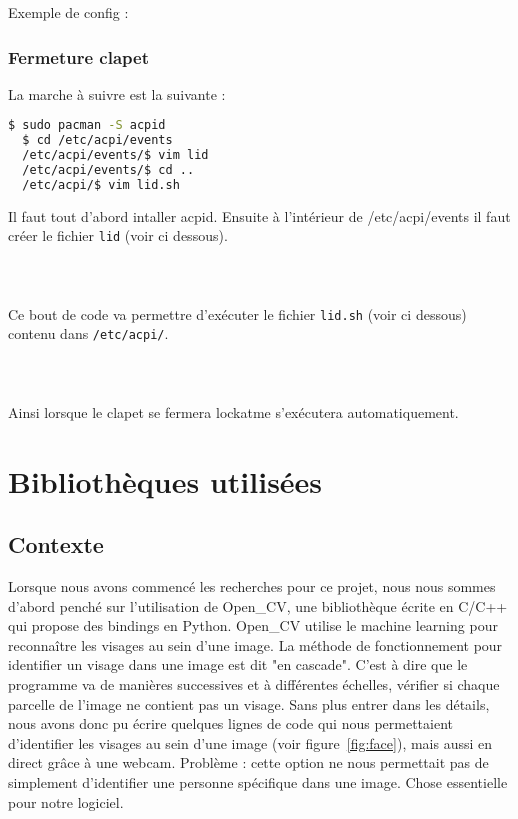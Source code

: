 Exemple de config :

\subsubsection{Fermeture clapet}
La marche à suivre est la suivante :
\begin{lstlisting}[language=bash]
  $ sudo pacman -S acpid
  $ cd /etc/acpi/events
  /etc/acpi/events/$ vim lid
  /etc/acpi/events/$ cd ..
  /etc/acpi/$ vim lid.sh
\end{lstlisting}
Il faut tout d'abord intaller acpid. Ensuite à
l'intérieur de /etc/acpi/events il faut créer le
fichier \verb|lid| (voir ci dessous).\\
\\
\\
\\
Ce bout de code va permettre d'exécuter le fichier \verb|lid.sh| (voir ci dessous)
contenu dans \verb|/etc/acpi/|.\\
\\
\\
\\
Ainsi lorsque le clapet se fermera lockatme s'exécutera automatiquement.

\newpage

\section{Bibliothèques utilisées}
\subsection{Contexte}
Lorsque nous avons commencé les recherches pour ce projet, nous nous sommes
d'abord penché sur l'utilisation de Open\_CV, une bibliothèque écrite en C/C++ qui
propose des bindings en Python. Open\_CV utilise le machine learning pour
reconnaître les visages au sein d'une image. La méthode de fonctionnement pour
identifier un visage dans une image est dit "en cascade". C'est à dire que le
programme va de manières successives et à différentes échelles, vérifier si
chaque parcelle de l'image ne contient pas un visage. Sans plus entrer dans
les détails, nous avons donc pu écrire quelques lignes de code qui nous
permettaient d'identifier les visages au sein d'une image (voir
figure~\ref{fig:face}), mais aussi en direct grâce à une webcam. Problème :
cette option ne nous permettait pas de simplement d'identifier une personne
spécifique dans une image. Chose essentielle pour notre logiciel.
\\

